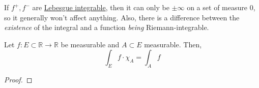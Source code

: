   If $f^+, f^-$ are \hyperref[def:leb-int-signed]{Lebesgue integrable}, then it can only be $\pm \infty$ on a set of measure $0$, so it generally won't affect anything. Also, there is a difference between the \textit{existence} of the integral and a function \textit{being} Riemann-integrable. 

  \begin{lemma}[Masking]
    \label{thm:masking-3}
    Let $f: E \subset \mathbb{R} \to \mathbb{R}$ be measurable and $A \subset E$ measurable. Then, 
    \begin{equation}
      \int_E f \cdot \chi_A = \int_A f
    \end{equation}
  \end{lemma}
  \begin{proof}
    
  \end{proof}

